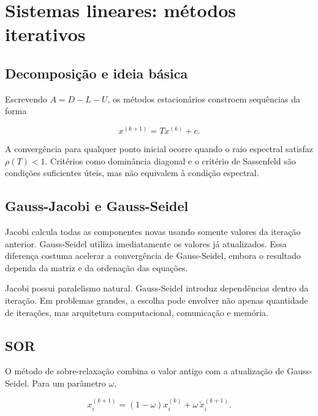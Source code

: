 \documentclass[12pt,a4paper,openany]{book}
\begin{document}
\chapter{Sistemas lineares: métodos iterativos}



\section{Decomposição e ideia básica}



Escrevendo $A=D-L-U$, os métodos estacionários constroem sequências da forma



\[x^{(k+1)}=T x^{(k)}+c.\]



A convergência para qualquer ponto inicial ocorre quando o raio espectral satisfaz $\rho(T)<1$. Critérios como dominância diagonal e o critério de Sassenfeld são condições suficientes úteis, mas não equivalem à condição espectral.



\section{Gauss-Jacobi e Gauss-Seidel}



Jacobi calcula todas as componentes novas usando somente valores da iteração anterior. Gauss-Seidel utiliza imediatamente os valores já atualizados. Essa diferença costuma acelerar a convergência de Gauss-Seidel, embora o resultado dependa da matriz e da ordenação das equações.



Jacobi possui paralelismo natural. Gauss-Seidel introduz dependências dentro da iteração. Em problemas grandes, a escolha pode envolver não apenas quantidade de iterações, mas arquitetura computacional, comunicação e memória.



\section{SOR}



O método de sobre-relaxação combina o valor antigo com a atualização de Gauss-Seidel. Para um parâmetro $\omega$,



\[x_i^{(k+1)}=(1-\omega)x_i^{(k)}+\omega\,\widetilde{x}_i^{(k+1)}.\]
\end{document}
